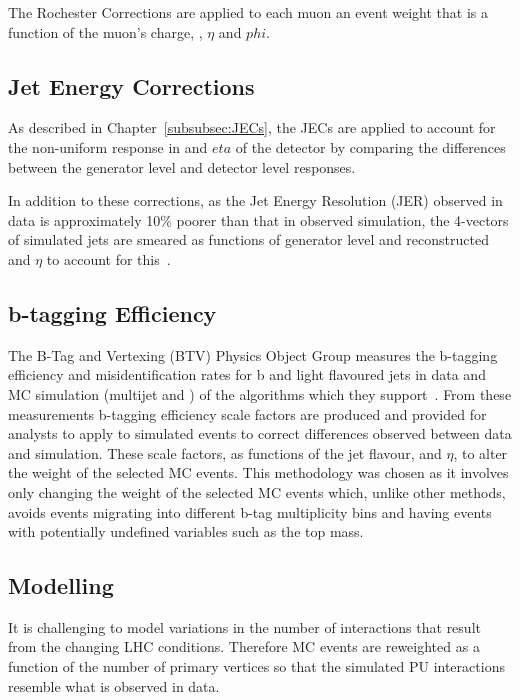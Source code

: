 The Rochester Corrections are applied to each muon an event weight that is a function of the muon's charge, \pt, $\eta$ and $phi$.

\subsection{Jet Energy Corrections}\label{subsec:jesjer}
As described in Chapter~\ref{subsubsec:JECs}, the JECs are applied to account for the non-uniform response in \pT and $eta$ of the detector by comparing the differences between the generator level and detector level responses.

In addition to these corrections, as the Jet Energy Resolution (JER) observed in data is approximately 10\% poorer than that in observed simulation, the 4-vectors of simulated jets are smeared as functions of generator level and reconstructed \pt and $\eta$ to account for this~\cite{Khachatryan:2016kdb}.

\subsection{b-tagging Efficiency}\label{subsec:btagEff}
The B-Tag and Vertexing (BTV) Physics Object Group measures the b-tagging efficiency and misidentification rates for b and light flavoured jets in data and MC simulation (multijet and \ttbar) of the algorithms which they support~\cite{Sirunyan:2017ezt}.
From these measurements b-tagging efficiency scale factors are produced and provided for analysts to apply to simulated events to correct differences observed between data and simulation.
These scale factors, as functions of the jet flavour, \pT and $\eta$, to alter the weight of the selected MC events.
This methodology was chosen as it involves only changing the weight of the selected MC events which, unlike other methods, avoids events migrating into different b-tag multiplicity bins and having events with potentially undefined variables such as the top mass.

\subsection{\PU Modelling}\label{subsec:puSF}
It is challenging to model variations in the number of \PU interactions that result from the changing LHC conditions.
Therefore MC events are reweighted as a function of the number of primary vertices so that the simulated PU interactions resemble what is observed in data.

